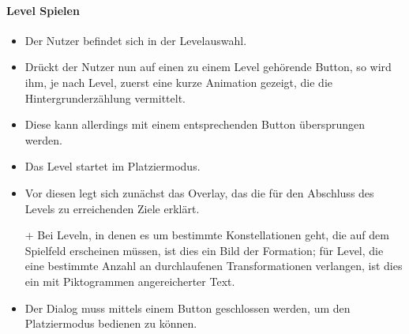 \paragraph{Level Spielen}
\begin{itemize}
\item Der Nutzer befindet sich in der Levelauswahl.
\item Drückt der Nutzer nun auf einen zu einem
Level gehörende Button, so wird ihm, je nach Level, zuerst eine kurze
Animation gezeigt, die die Hintergrunderzählung vermittelt. 
\item Diese kann allerdings mit einem entsprechenden Button übersprungen werden.
\item Das Level startet im Platziermodus.
\item Vor diesen legt sich zunächst das Overlay, das die für den Abschluss des Levels zu erreichenden Ziele
erklärt.
\item[+] Bei Leveln, in denen es um bestimmte Konstellationen geht, die auf
dem Spielfeld erscheinen müssen, ist dies ein Bild der Formation; für Level, die eine bestimmte Anzahl an durchlaufenen Transformationen
verlangen, ist dies ein mit Piktogrammen angereicherter Text.
\item Der Dialog muss mittels einem Button geschlossen werden, um den
Platziermodus bedienen zu können. 
\end{itemize}


